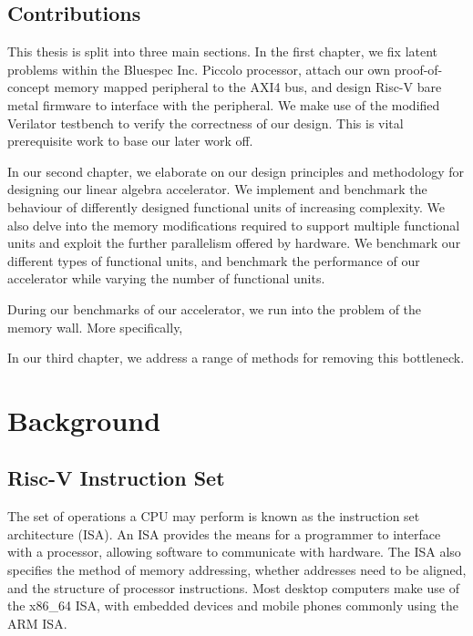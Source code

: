 \documentclass[a4paper,8pt]{report}
\begin{document}





\section{Contributions}
This thesis is split into three main sections. In the first chapter, we fix
latent problems within the Bluespec Inc. Piccolo processor, attach our own
proof-of-concept memory mapped peripheral to the AXI4 bus, and design Risc-V
bare metal firmware to interface with the peripheral. We make use of the
modified Verilator testbench to verify the correctness of our design. This is
vital prerequisite work to base our later work off.

In our second chapter, we elaborate on our design principles and methodology for
designing our linear algebra accelerator. We implement and benchmark the behaviour
of differently designed functional units of increasing complexity. We also delve
into the memory modifications required to support multiple functional units and
exploit the further parallelism offered by hardware. We benchmark our different
types of functional units, and benchmark the performance of our accelerator
while varying the number of functional units.

During our benchmarks of our accelerator, we run into the problem of the memory
wall. More specifically, 

In our third chapter, we address a range of methods for removing this bottleneck.


\chapter{Background}
\section{Risc-V Instruction Set}
The set of operations a CPU may perform is known as the instruction set
architecture (ISA). An ISA provides the means for a
programmer to interface with a processor, allowing software to communicate with
hardware. The ISA also specifies the method of memory addressing, whether
addresses need to be aligned, and the structure of processor instructions. Most
desktop computers make use of the x86\_64 ISA, with embedded devices and mobile
phones commonly using the ARM ISA.
\end{document}
